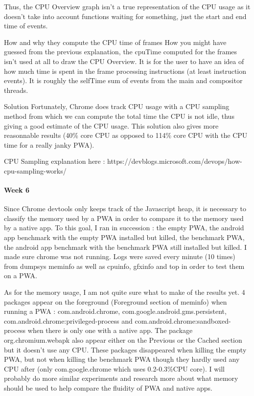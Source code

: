 \documentclass{kththesis}
\begin{document}
Thus, the CPU Overview graph isn't a true representation of the CPU usage as it doesn't take into account functions waiting for something, just the start and end time of events. 

How and why they compute the CPU time of frames
    How you might have guessed from the previous explanation, the cpuTime computed for the frames isn't used at all to draw the CPU Overview. It is for the user to have an idea of how much time is spent in the frame processing instructions (at least instruction events). It is roughly the selfTime sum of events from the main and compositor threads. 

Solution
    Fortunately, Chrome does track CPU usage with a CPU sampling method from which we can compute the total time the CPU is not idle, thus giving a good estimate of the CPU usage.
This solution also gives more reasonnable results (40\% core CPU as opposed to 114\% core CPU with the CPU time for a really janky PWA).

CPU Sampling explanation here : https://devblogs.microsoft.com/devops/how-cpu-sampling-works/

\paragraph{Week 6}
Since Chrome devtools only keeps track of the Javascript heap, it is necessary to classify the memory used by a PWA in order to compare it to the memory used by a native app.
To this goal, I ran in succession : the empty PWA, the android app benchmark with the empty PWA installed but killed, the benchmark PWA, the android app benchmark with the benchmark PWA still installed but killed. I made sure chrome was not running. Logs were saved every minute (10 times) from dumpsys meminfo as well as cpuinfo, gfxinfo and top in order to test them on a PWA. 

As for the memory usage, I am not quite sure what to make of the results yet.
4 packages appear on the foreground (Foreground section of meminfo) when running a PWA : com.android.chrome, com.google.android.gms.persistent,  com.android.chrome:privileged-process and com.android.chrome:sandboxed-process when there is only one with a native app. The package org.chromium.webapk also appear either on the Previous or the Cached section but it doesn't use any CPU.
These packages disappeared when killing the empty PWA, but not when killing the benchmark PWA though they hardly used any CPU after (only com.google.chrome which uses 0.2-0.3\%CPU core). 
I will probably do more similar experiments and research more about what memory should be used to help compare the fluidity of PWA and native apps.
\end{document}
